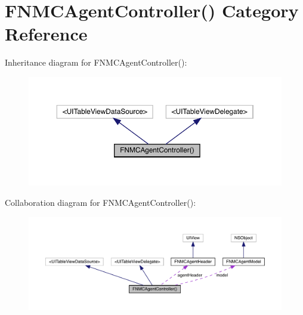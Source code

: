\hypertarget{category_f_n_m_c_agent_controller_07_08}{}\section{F\+N\+M\+C\+Agent\+Controller() Category Reference}
\label{category_f_n_m_c_agent_controller_07_08}


Inheritance diagram for F\+N\+M\+C\+Agent\+Controller()\+:\nopagebreak
\begin{figure}[H]
\begin{center}
\leavevmode
\includegraphics[width=350pt]{category_f_n_m_c_agent_controller_07_08__inherit__graph}
\end{center}
\end{figure}


Collaboration diagram for F\+N\+M\+C\+Agent\+Controller()\+:\nopagebreak
\begin{figure}[H]
\begin{center}
\leavevmode
\includegraphics[width=350pt]{category_f_n_m_c_agent_controller_07_08__coll__graph}
\end{center}
\end{figure}
